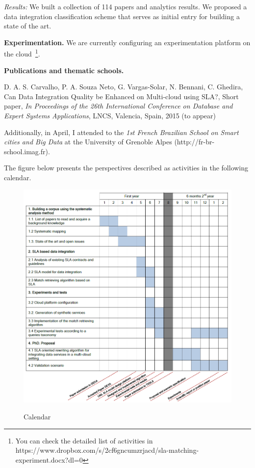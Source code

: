 \documentclass[11pt,a4paper,oneside]{report}
\begin{document}
\noindent
{\em Results:} We built a collection of 114 papers and analytics results. We proposed a data integration classification scheme that serves as initial entry for building a state of the art. 


\noindent
\textbf{Experimentation.} We are currently  configuring an experimentation platform on the cloud~\footnote{You can check the detailed list of activities in https://www.dropbox.com/s/2cf6gncumzrjacd/sla-matching-experiment.docx?dl=0}.
%

\noindent
\textbf{Publications and thematic schools.}

\noindent
D. A. S. Carvalho, P. A. Souza Neto, G. Vargas-Solar, N. Bennani, C. Ghedira, Can Data Integration Quality be Enhanced on Multi-cloud using SLA?, Short paper, {\em In Proceedings of the 26th International Conference on Database and Expert Systems Applications}, LNCS, Valencia, Spain, 2015 (to appear)

\noindent
Additionally, in April, I attended to the \emph{1st French Brazilian School on Smart cities and Big Data} at the University of Grenoble Alpes (http://fr-br-school.imag.fr).

\noindent
The figure below presents the perspectives described as activities in the following calendar. 

\begin{figure}[!b]
\center
\includegraphics[scale=0.50]{calendario.png} \label{fig:calendar} \caption{Calendar}
\end{figure}



\end{document}
